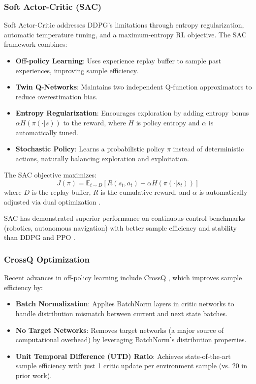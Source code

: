 \subsubsection*{Soft Actor-Critic (SAC)}

Soft Actor-Critic \cite{Haarnoja2018, Haarnoja2019} addresses DDPG's limitations through entropy regularization, automatic temperature tuning, and a maximum-entropy RL objective. The SAC framework combines:

\begin{itemize}
\item \textbf{Off-policy Learning}: Uses experience replay buffer to sample past experiences, improving sample efficiency.
\item \textbf{Twin Q-Networks}: Maintains two independent Q-function approximators to reduce overestimation bias.
\item \textbf{Entropy Regularization}: Encourages exploration by adding entropy bonus $\alpha H(\pi(\cdot|s))$ to the reward, where $H$ is policy entropy and $\alpha$ is automatically tuned.
\item \textbf{Stochastic Policy}: Learns a probabilistic policy $\pi$ instead of deterministic actions, naturally balancing exploration and exploitation.
\end{itemize}

The SAC objective maximizes:
\begin{equation}
J(\pi) = \mathbb{E}_{t \sim D}[R(s_t, a_t) + \alpha H(\pi(\cdot|s_t))]
\end{equation}
where $D$ is the replay buffer, $R$ is the cumulative reward, and $\alpha$ is automatically adjusted via dual optimization \cite{Haarnoja2018}.

SAC has demonstrated superior performance on continuous control benchmarks (robotics, autonomous navigation) with better sample efficiency and stability than DDPG and PPO \cite{Haarnoja2019}.

\subsubsection*{CrossQ Optimization}

Recent advances in off-policy learning include CrossQ \cite{Bhatt2019}, which improves sample efficiency by:

\begin{itemize}
\item \textbf{Batch Normalization}: Applies BatchNorm layers in critic networks to handle distribution mismatch between current and next state batches.
\item \textbf{No Target Networks}: Removes target networks (a major source of computational overhead) by leveraging BatchNorm's distribution properties.
\item \textbf{Unit Temporal Difference (UTD) Ratio}: Achieves state-of-the-art sample efficiency with just 1 critic update per environment sample (vs. 20 in prior work).
\end{itemize}

